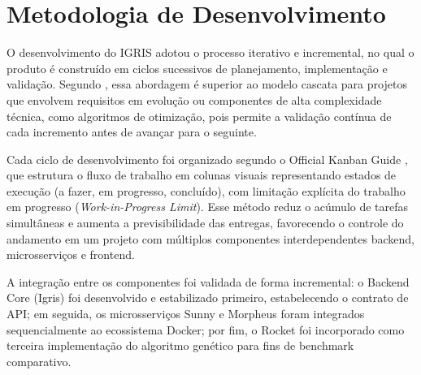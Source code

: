 ﻿\section{Metodologia de Desenvolvimento}
\label{sec:3.2}

O desenvolvimento do IGRIS adotou o processo iterativo e incremental, no qual o produto é construído em ciclos sucessivos de planejamento, implementação e validação. Segundo , essa abordagem é superior ao modelo cascata para projetos que envolvem requisitos em evolução ou componentes de alta complexidade técnica, como algoritmos de otimização, pois permite a validação contínua de cada incremento antes de avançar para o seguinte.

Cada ciclo de desenvolvimento foi organizado segundo o Official Kanban Guide \cite{kanbanuniversity2020}, que estrutura o fluxo de trabalho em colunas visuais representando estados de execução (a fazer, em progresso, concluído), com limitação explícita do trabalho em progresso (\textit{Work-in-Progress Limit}). Esse método reduz o acúmulo de tarefas simultâneas e aumenta a previsibilidade das entregas, favorecendo o controle do andamento em um projeto com múltiplos componentes interdependentes backend, microsserviços e frontend.

A integração entre os componentes foi validada de forma incremental: o Backend Core (Igris) foi desenvolvido e estabilizado primeiro, estabelecendo o contrato de API; em seguida, os microsserviços Sunny e Morpheus foram integrados sequencialmente ao ecossistema Docker; por fim, o Rocket foi incorporado como terceira implementação do algoritmo genético para fins de benchmark comparativo.
